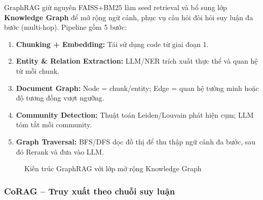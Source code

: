 \documentclass[10pt, conference, a4paper, compsocconf]{IEEEtran}
\begin{document}
GraphRAG giữ nguyên FAISS+BM25 làm seed retrieval và bổ sung lớp
\textbf{Knowledge Graph} để mở rộng ngữ cảnh, phục vụ câu hỏi đòi hỏi
suy luận đa bước (multi-hop). Pipeline gồm 5 bước:

\begin{enumerate}
\item \textbf{Chunking + Embedding:} Tái sử dụng code từ giai đoạn 1.
\item \textbf{Entity \& Relation Extraction:} LLM/NER trích xuất thực thể
  và quan hệ từ mỗi chunk.
\item \textbf{Document Graph:} Node = chunk/entity; Edge = quan hệ tường
  minh hoặc độ tương đồng vượt ngưỡng.
\item \textbf{Community Detection:} Thuật toán Leiden/Louvain phát hiện
  cụm; LLM tóm tắt mỗi community.
\item \textbf{Graph Traversal:} BFS/DFS dọc đồ thị để thu thập ngữ cảnh
  đa bước, sau đó Rerank và đưa vào LLM.
\end{enumerate}

\begin{figure}[H]
\centering
{}
\caption{Kiến trúc GraphRAG với lớp mở rộng Knowledge Graph}
\label{fig:graphrag}
\end{figure}

\subsubsection{CoRAG -- Truy xuất theo chuỗi suy luận}
\end{document}
